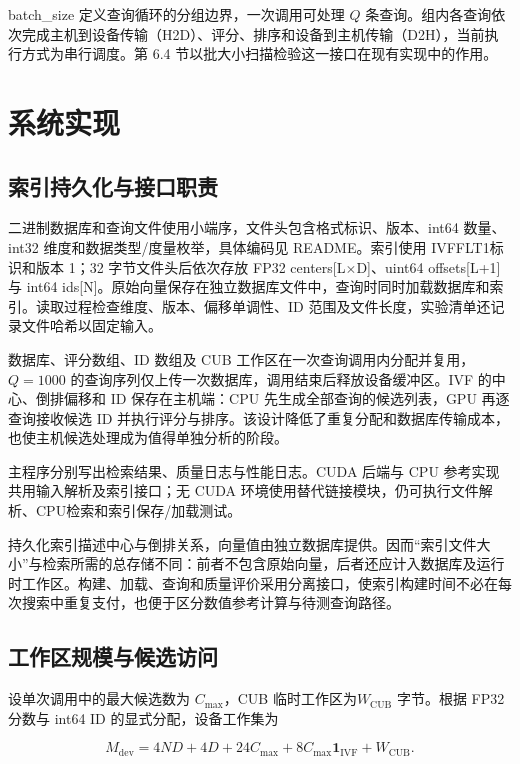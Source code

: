 \documentclass[UTF8,a4paper,zihao=5,fontset=none]{ctexart}
\begin{document}
{\small\ttfamily batch\_\allowbreak{}size} 定义查询循环的分组边界，一次调用可处理 $Q$ 条查询。组内各查询依次完成主机到设备传输（H2D）、评分、排序和设备到主机传输（D2H），当前执行方式为串行调度。第 6.4 节以批大小扫描检验这一接口在现有实现中的作用。


\section{系统实现}

\subsection{索引持久化与接口职责}

二进制数据库和查询文件使用小端序，文件头包含格式标识、版本、int64 数量、int32 维度和数据类型/度量枚举，具体编码见 README。索引使用 {\small\ttfamily IVFFLT1}标识和版本 1；32 字节文件头后依次存放 FP32 {\small\ttfamily centers[L\ensuremath{\times}D]}、uint64 {\small\ttfamily offsets[L+1]} 与 int64 {\small\ttfamily ids[N]}。原始向量保存在独立数据库文件中，查询时同时加载数据库和索引。读取过程检查维度、版本、偏移单调性、ID 范围及文件长度，实验清单还记录文件哈希以固定输入。


数据库、评分数组、ID 数组及 CUB 工作区在一次查询调用内分配并复用，$Q=1000$ 的查询序列仅上传一次数据库，调用结束后释放设备缓冲区。IVF 的中心、倒排偏移和 ID 保存在主机端：CPU 先生成全部查询的候选列表，GPU 再逐查询接收候选 ID 并执行评分与排序。该设计降低了重复分配和数据库传输成本，也使主机候选处理成为值得单独分析的阶段。


主程序分别写出检索结果、质量日志与性能日志。CUDA 后端与 CPU 参考实现共用输入解析及索引接口；无 CUDA 环境使用替代链接模块，仍可执行文件解析、CPU检索和索引保存/加载测试。


持久化索引描述中心与倒排关系，向量值由独立数据库提供。因而“索引文件大小”与检索所需的总存储不同：前者不包含原始向量，后者还应计入数据库及运行时工作区。构建、加载、查询和质量评价采用分离接口，使索引构建时间不必在每次搜索中重复支付，也便于区分数值参考计算与待测查询路径。


\subsection{工作区规模与候选访问}

设单次调用中的最大候选数为 $C_{\max}$，CUB 临时工作区为$W_{\mathrm{CUB}}$ 字节。根据 FP32 分数与 int64 ID 的显式分配，设备工作集为


\nopagebreak[4]
\begin{equation}
\label{eq:3}
M_{\mathrm{dev}}=4ND+4D+24C_{\max}
 +8C_{\max}\mathbf{1}_{\mathrm{IVF}}+W_{\mathrm{CUB}}.
\end{equation}
\end{document}
